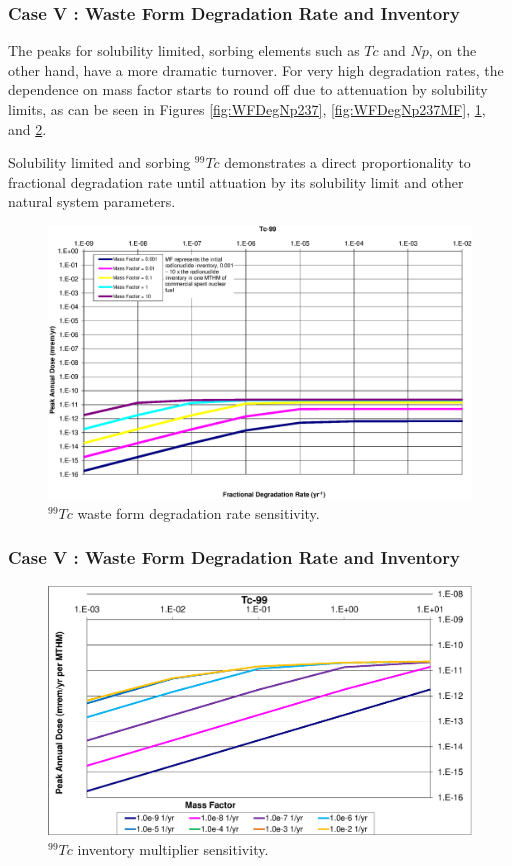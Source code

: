 \begin{frame}[c]
  \frametitle{Case V : Waste Form Degradation Rate and Inventory}
The peaks for solubility limited, sorbing elements such as $Tc$ and $Np$, on the 
other hand, have a more dramatic turnover.  For very high degradation rates, the 
dependence on mass factor starts to round off due to attenuation by solubility 
limits, as can be seen in Figures \ref{fig:WFDegNp237}, \ref{fig:WFDegNp237MF}, 
\ref{fig:WFDegTc99}, and \ref{fig:WFDegTc99MF}.

Solubility limited and sorbing $^{99}Tc$ demonstrates a direct proportionality 
to fractional degradation rate until attuation by its solubility limit and other 
natural system parameters.  

\begin{figure}[ht!]
\centering
\includegraphics[width=\linewidth]{WFDegAndInv/Tc-99.eps}
\caption{$^{99}Tc$ waste form degradation rate sensitivity.}
\label{fig:WFDegTc99}
\end{figure}
\end{frame}

\begin{frame}[c]
  \frametitle{Case V : Waste Form Degradation Rate and Inventory}

\begin{figure}[ht!]
\centering
\includegraphics[width=\linewidth]{WFDegAndInv/Tc-99-MF.eps}
\caption{$^{99}Tc$ inventory multiplier sensitivity.}
\label{fig:WFDegTc99MF}
\end{figure}

\end{frame}

